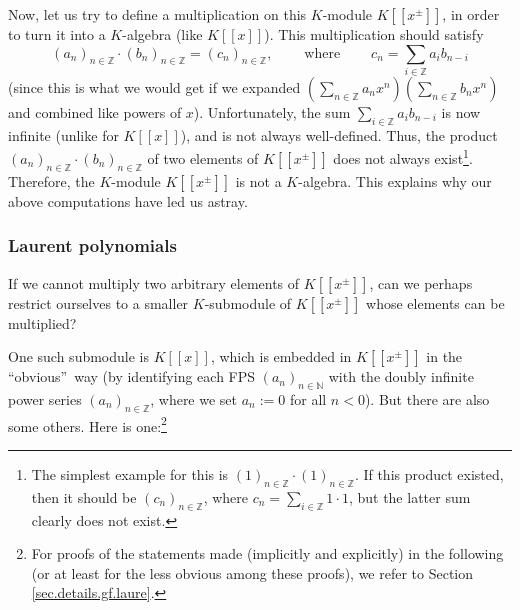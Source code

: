 Now, let us try to define a multiplication on this $K$-module $K\left[
\left[  x^{\pm}\right]  \right]  $, in order to turn it into a $K$-algebra
(like $K\left[  \left[  x\right]  \right]  $). This multiplication should
satisfy%
\[
\left(  a_{n}\right)  _{n\in\mathbb{Z}}\cdot\left(  b_{n}\right)
_{n\in\mathbb{Z}}=\left(  c_{n}\right)  _{n\in\mathbb{Z}}%
,\ \ \ \ \ \ \ \ \ \ \text{where}\ \ \ \ \ \ \ \ \ \ c_{n}=\sum_{i\in
\mathbb{Z}}a_{i}b_{n-i}%
\]
(since this is what we would get if we expanded $\left(  \sum_{n\in\mathbb{Z}%
}a_{n}x^{n}\right)  \left(  \sum_{n\in\mathbb{Z}}b_{n}x^{n}\right)  $ and
combined like powers of $x$). Unfortunately, the sum $\sum_{i\in\mathbb{Z}%
}a_{i}b_{n-i}$ is now infinite (unlike for $K\left[  \left[  x\right]
\right]  $), and is not always well-defined. Thus, the product $\left(
a_{n}\right)  _{n\in\mathbb{Z}}\cdot\left(  b_{n}\right)  _{n\in\mathbb{Z}}$
of two elements of $K\left[  \left[  x^{\pm}\right]  \right]  $ does not
always exist\footnote{The simplest example for this is $\left(  1\right)
_{n\in\mathbb{Z}}\cdot\left(  1\right)  _{n\in\mathbb{Z}}$. If this product
existed, then it should be $\left(  c_{n}\right)  _{n\in\mathbb{Z}}$, where
$c_{n}=\sum_{i\in\mathbb{Z}}1\cdot1$, but the latter sum clearly does not
exist.}. Therefore, the $K$-module $K\left[  \left[  x^{\pm}\right]  \right]
$ is not a $K$-algebra. This explains why our above computations have led us astray.

\subsubsection{Laurent polynomials}

If we cannot multiply two arbitrary elements of $K\left[  \left[  x^{\pm
}\right]  \right]  $, can we perhaps restrict ourselves to a smaller
$K$-submodule of $K\left[  \left[  x^{\pm}\right]  \right]  $ whose elements
can be multiplied?

One such submodule is $K\left[  \left[  x\right]  \right]  $, which is
embedded in $K\left[  \left[  x^{\pm}\right]  \right]  $ in the
\textquotedblleft obvious\textquotedblright\ way (by identifying each FPS
$\left(  a_{n}\right)  _{n\in\mathbb{N}}$ with the doubly infinite power
series $\left(  a_{n}\right)  _{n\in\mathbb{Z}}$, where we set $a_{n}:=0$ for
all $n<0$). But there are also some others. Here is one:\footnote{For proofs
of the statements made (implicitly and explicitly) in the following (or at
least for the less obvious among these proofs), we refer to Section
\ref{sec.details.gf.laure}.}

